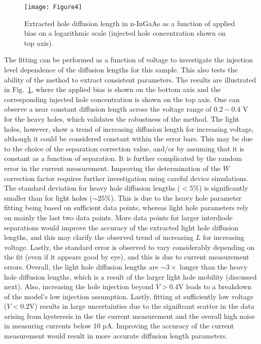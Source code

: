 \documentclass[aip,amsmath,amssymb,reprint]{revtex4-1}
\begin{document}
  \begin{figure} [t]
   \begin{center}
    \texttt{[image: Figure4]}
    \end{center}
    \caption[example]
    {\label{fig:fig-4}
 Extracted hole diffusion length in n-InGaAs as a function of applied bias on a logarithmic scale (injected hole concentration shown on top axis). }
    \end{figure}
%
The fitting can be performed as a function of voltage to investigate the injection level dependence of the diffusion lengths for this sample.
 This also tests the ability of the method to extract consistent parameters.
 The results are illustrated in Fig.~\ref{fig:fig-4}, where the applied bias is shown on the bottom axis and the corresponding injected hole concentration is shown on the top axis.
 One can observe a near constant diffusion length across the voltage range of $0.2-0.4$ V for the heavy holes, which validates the robustness of the method.
 The light holes, however, show a trend of increasing diffusion length for increasing voltage, although it could be considered constant within the error bars.
 This may be due to the choice of the separation correction value, and/or by assuming that it is constant as a function of separation.
 It is further complicated by the random error in the current measurement.
 Improving the determination of the $W$ correction factor requires further investigation using careful device simulations.
 The standard deviation for heavy hole diffusion lengths ($<5\%$) is significantly smaller than for light holes (${\sim}25\%$). This is due to the heavy hole parameter fitting being based on sufficient data points, whereas light hole parameters rely on mainly the last two data points.
 More data points for larger interdiode separations would improve the accuracy of the extracted light hole diffusion lengths, and this may clarify the observed trend of increasing $L$ for increasing voltage.
 Lastly, the standard error is observed to vary considerably depending on the fit (even if it appears good by eye), and this is due to current measurement errors.
 Overall, the light hole diffusion lengths are ${\sim}3\times$ longer than the heavy hole diffusion lengths, which is a result of the larger light hole mobility (discussed next).
 Also, increasing the hole injection beyond $V>0.4$V leads to a breakdown of the model's low injection assumption.
 Lastly, fitting at sufficiently low voltage ($V<0.2$V) results in large uncertainties due to the significant scatter in the data arising from hysteresis in the the current measurement and the overall high noise in measuring currents below 10 pA.
 Improving the accuracy of the current measurement would result in more accurate diffusion length parameters.
\end{document}
